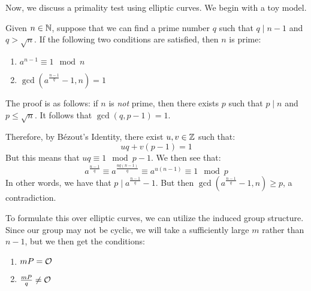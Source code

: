 \documentclass{article}
\begin{document}
Now, we discuss a primality test using elliptic curves.
We begin with a toy model.

Given $ n \in \mathbb{N} $, suppose that we can find a prime number $ q $ such that $ q \mid n-1 $ and
$ q > \sqrt{n} $. If the following two conditions are satisfied, then $ n $ is prime:
\begin{enumerate}
    \item $ a^{n-1} \equiv 1 \mod n $
    \item $ \gcd(a^{\frac{n-1}{q}} - 1, n) = 1 $
\end{enumerate}
The proof is as follows: if $ n $ is \textit{not} prime, then there exists $ p $ such that
$ p \mid n $ and $ p \leq \sqrt{n} $. It follows that $ \gcd(q, p-1) = 1 $.

Therefore, by B\'ezout's Identity, there exist $ u, v \in \mathbb{Z} $ such that:
\begin{equation*}
    uq + v(p-1) = 1
\end{equation*}
But this means that $ uq \equiv 1 \mod p-1 $. We then see that:
\begin{equation*}
    a^{\frac{n-1}{q}} \equiv a^{\frac{uq(n-1)}{q}} \equiv a^{u(n-1)} \equiv 1 \mod p
\end{equation*}
In other words, we have that $ p \mid a^{\frac{n-1}{q}} - 1 $.
But then $ \gcd(a^{\frac{n-1}{q}} - 1, n) \geq p $, a contradiction.

To formulate this over elliptic curves, we can utilize the induced group structure.
Since our group may not be cyclic, we will take a sufficiently large $ m $ rather than $ n-1 $,
but we then get the conditions:
\begin{enumerate}
    \item $ mP = \mathcal{O} $
    \item $ \frac{mP}{q} \neq \mathcal{O} $
\end{enumerate}
\end{document}
